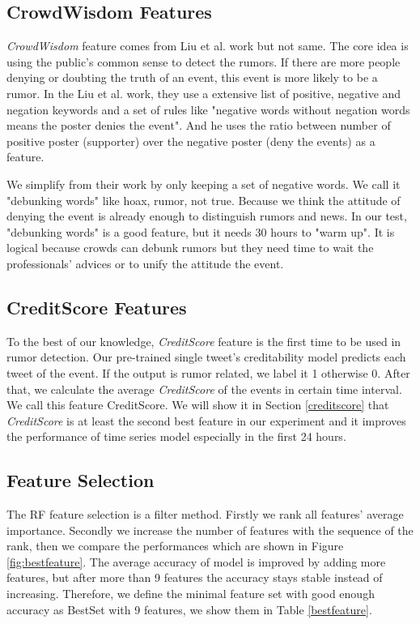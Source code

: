 \clearpage
\subsection{CrowdWisdom Features}
\emph{CrowdWisdom} feature comes from Liu et al. work \cite{liu2015real} but not same. The core idea is using the public's common sense to detect the rumors. If there are more people denying or doubting the truth of an event, this event is more likely to be a rumor. 
In the Liu et al. work, they use a extensive list of positive, negative and negation keywords and a set of rules like "negative words without negation words means the poster denies the event". And he uses the ratio between number of positive poster (supporter) over the negative poster (deny the events) as a feature.

We simplify from their work by only keeping a set of negative words. We call it "debunking words" like hoax, rumor, not true. Because we think the attitude of denying the event is already enough to distinguish rumors and news. In our test, "debunking words" is a good feature, but it needs 30 hours to "warm up". It is logical because crowds can debunk rumors but they need time to wait the professionals' advices or to unify the attitude the event.

\subsection{CreditScore Features}
To the best of our knowledge, \emph{CreditScore} feature is the first time to be used in rumor detection. Our pre-trained single tweet's creditability model predicts each tweet of the event. If the output is rumor related, we label it 1 otherwise 0. After that, we calculate the average \emph{CreditScore} of the events in certain time interval. We call this feature CreditScore. We will show it in Section \ref{creditscore} that \emph{CreditScore} is at least the second best feature in our experiment and it improves the performance of time series model especially in the first 24 hours.  
\subsection{Feature Selection} 
 \label{featusele}
 The RF feature selection is a filter method. Firstly we rank all features' average importance. Secondly we increase the number of features with the sequence of the rank, then we compare the performances which are shown in Figure \ref{fig:bestfeature}. The average accuracy of model is improved by adding more features, but after more than 9 features the accuracy stays stable instead of increasing. Therefore, we define the minimal feature set with good enough accuracy as BestSet with 9 features, we show them in Table \ref{bestfeature}.
 
